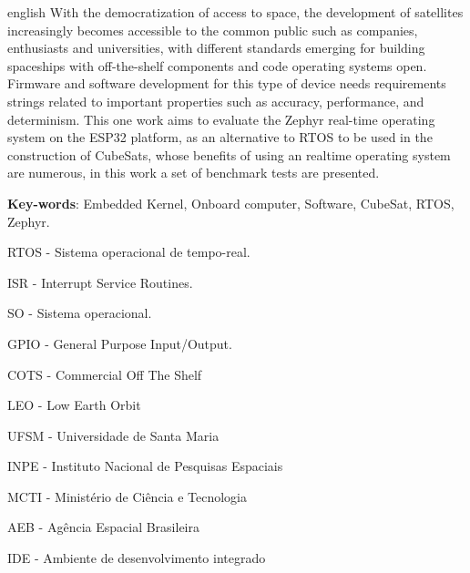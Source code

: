 \begin{resumo}[Abstract]
	\begin{otherlanguage*}{english}
With the democratization of access to space, the development of satellites increasingly becomes 
accessible to the common public such as companies, enthusiasts and universities, with different standards emerging 
for building spaceships with off-the-shelf components and code operating systems 
open. Firmware and software development for this type of device needs requirements 
strings related to important properties such as accuracy, performance, and determinism. This one 
work aims to evaluate the Zephyr real-time operating system on the ESP32 platform, 
as an alternative to RTOS to be used in the construction of CubeSats, whose benefits of 
using an realtime operating system are numerous, in this work a set of benchmark tests are presented. 
		\vspace{\onelineskip}

		\noindent
		\textbf{Key-words}: Embedded Kernel, Onboard computer, Software, CubeSat, RTOS, Zephyr.
	\end{otherlanguage*}
\end{resumo}


\listoffigures*

\newpage
{}
\newpage
\listoftables*
\cleardoublepage

\begin{siglas}
	\item RTOS - Sistema operacional de tempo-real.
	\item ISR - Interrupt Service Routines.
	\item SO - Sistema operacional.
	\item GPIO - General Purpose Input/Output.
	\item COTS - Commercial Off The Shelf
	\item LEO - Low Earth Orbit
	\item UFSM - Universidade de Santa Maria
	\item INPE - Instituto Nacional de Pesquisas Espaciais
	\item MCTI - Ministério de Ciência e Tecnologia
	\item AEB - Agência Espacial Brasileira
	\item IDE - Ambiente de desenvolvimento integrado
\end{siglas}


\tableofcontents*
\cleardoublepage

